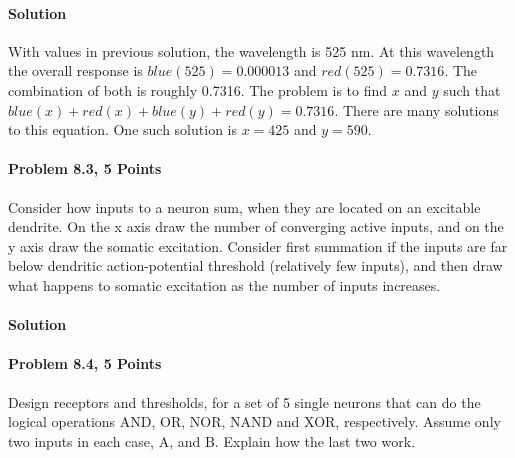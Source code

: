 \documentclass[a4paper,10pt]{article}
\begin{document}
\paragraph{Solution} With values in previous solution, the wavelength is 525 nm.
At this wavelength the overall response is $blue(525) = 0.000013$ and $red(525)
= 0.7316$. The combination of both is roughly 0.7316. The problem is to find
$x$ and $y$ such that $blue(x)+red(x) + blue(y) + red(y) = 0.7316$. 
There are many solutions to this equation. One such solution is $x = 425$ and
$y=590$.

\paragraph{Problem 8.3, 5 Points}
Consider how inputs to a neuron sum, when they are located on an excitable
dendrite. On the x axis draw the number of converging active inputs, and on the
y axis draw the somatic excitation. Consider first summation if the inputs are
far below dendritic action-potential threshold (relatively few inputs), and then
draw what happens to somatic excitation as the number of inputs increases.

\paragraph{Solution} 


\paragraph{Problem 8.4, 5 Points}
Design receptors and thresholds, for a set of 5 single neurons that can  do the
logical operations AND, OR, NOR, NAND and XOR, respectively. Assume only two
inputs in each case, A, and B. Explain how the last two work.
\end{document}
